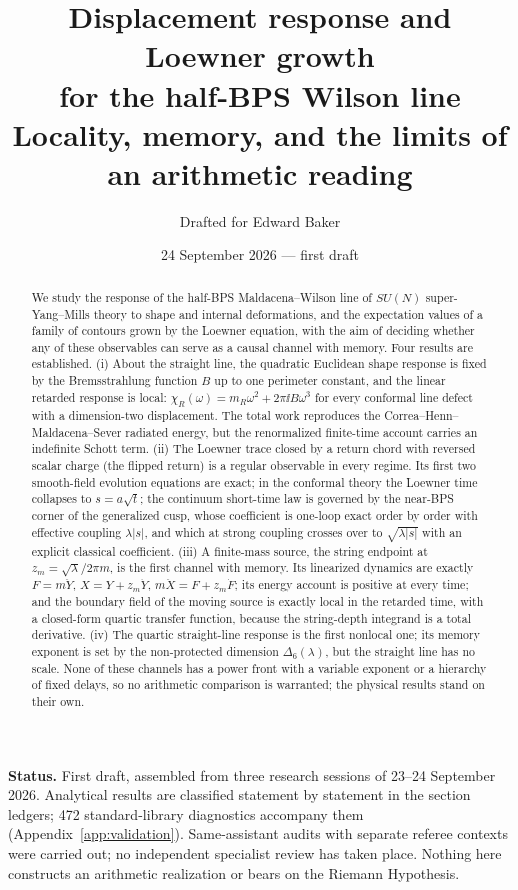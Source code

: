 \documentclass[11pt]{article}
\title{Displacement response and Loewner growth\\for the half-BPS Wilson line\\[4pt]
\large Locality, memory, and the limits of an arithmetic reading}
\author{Drafted for Edward Baker}
\date{24 September 2026 --- first draft}
\begin{document}
\maketitle
\begin{abstract}
We study the response of the half-BPS Maldacena--Wilson line of $SU(N)$ \Nfour{} super-Yang--Mills
theory to shape and internal deformations, and the expectation values of a family of contours grown by
the Loewner equation, with the aim of deciding whether any of these observables can serve as a causal
channel with memory. Four results are established. (i) About the straight line, the quadratic Euclidean
shape response is fixed by the Bremsstrahlung function $B$ up to one perimeter constant, and the linear
retarded response is local: $\chi_R(\omega)=m_R\omega^2+2\pi\ii B\omega^3$ for every conformal line
defect with a dimension-two displacement. The total work reproduces the Correa--Henn--Maldacena--Sever
radiated energy, but the renormalized finite-time account carries an indefinite Schott term.
(ii) The Loewner trace closed by a return chord with reversed scalar charge (the flipped return) is a
regular observable in every regime. Its first two smooth-field evolution equations are exact; in the
conformal theory the Loewner time collapses to $s=a\sqrt t$; the continuum short-time law is governed by
the near-BPS corner of the generalized cusp, whose coefficient is one-loop exact order by order with
effective coupling $\lambda|s|$, and which at strong coupling crosses over to $\sqrt{\lambda|s|}$ with an
explicit classical coefficient. (iii) A finite-mass source, the string endpoint at
$z_m=\sqrt\lambda/2\pi m$, is the first channel with memory. Its linearized dynamics are exactly
$F=m\ddot Y$, $X=Y+z_m\dot Y$, $m\ddot X=F+z_m\dot F$; its energy account is positive at every time; and
the boundary field of the moving source is exactly local in the retarded time, with a closed-form quartic
transfer function, because the string-depth integrand is a total derivative. (iv) The quartic
straight-line response is the first nonlocal one; its memory exponent is set by the non-protected
dimension $\Delta_6(\lambda)$, but the straight line has no scale. None of these channels has a power
front with a variable exponent or a hierarchy of fixed delays, so no arithmetic comparison is warranted;
the physical results stand on their own.
\end{abstract}
\noindent\textbf{Status.} First draft, assembled from three research sessions of 23--24 September 2026.
Analytical results are classified statement by statement in the section ledgers; 472 standard-library
diagnostics accompany them (Appendix~\ref{app:validation}). Same-assistant audits with separate referee
contexts were carried out; no independent specialist review has taken place. Nothing here constructs an
arithmetic realization or bears on the Riemann Hypothesis.
{\small\tableofcontents}
\bigskip







\appendix

\clearpage

\end{document}
